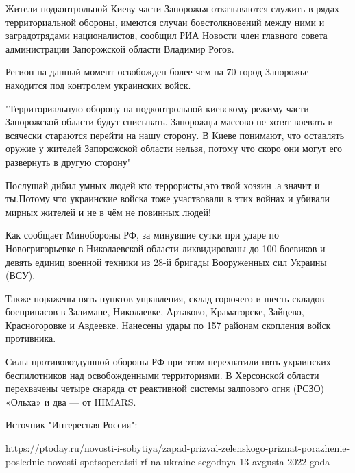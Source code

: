 
Жители подконтрольной Киеву части Запорожья отказываются служить в рядах
территориальной обороны, имеются случаи боестолкновений между ними и
заградотрядами националистов, сообщил РИА Новости член главного совета
администрации Запорожской области Владимир Рогов.

Регион на данный момент освобожден более чем на 70%
город Запорожье находится под контролем украинских войск.

"Территориальную оборону на подконтрольной киевскому режиму части Запорожской
области будут списывать. Запорожцы массово не хотят воевать и всячески
стараются перейти на нашу сторону. В Киеве понимают, что оставлять оружие у
жителей Запорожской области нельзя, потому что скоро они могут его развернуть в
другую сторону"


Послушай дибил умных людей кто террористы,это твой хозяин ,а значит и ты.Потому
что украинские войска тоже участвовали в этих войнах и убивали мирных жителей и
не в чём не повинных людей!


Как сообщает Минобороны РФ, за минувшие сутки при ударе по Новогригорьевке в
Николаевской области ликвидированы до 100 боевиков и девять единиц военной
техники из 28-й бригады Вооруженных сил Украины (ВСУ).

Также поражены пять пунктов управления, склад горючего и шесть складов
боеприпасов в Залимане, Николаевке, Артаково, Краматорске, Зайцево,
Красногоровке и Авдеевке. Нанесены удары по 157 районам скопления войск
противника.

Силы противовоздушной обороны РФ при этом перехватили пять украинских
беспилотников над освобожденными территориями. В Херсонской области перехвачены
четыре снаряда от реактивной системы залпового огня (РСЗО) «Ольха» и два — от
HIMARS.

Источник "Интересная Россия": 

https://ptoday.ru/novosti-i-sobytiya/zapad-prizval-zelenskogo-priznat-porazhenie-poslednie-novosti-spetsoperatsii-rf-na-ukraine-segodnya-13-avgusta-2022-goda

